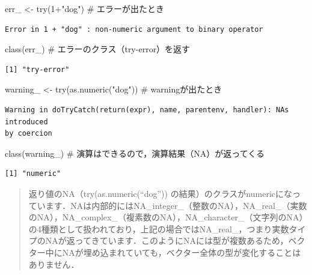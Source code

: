 \documentclass[
  letterpaper,
  DIV=11,
  numbers=noendperiod]{scrreprt}
\newenvironment{Shaded}{\begin{snugshade}}{\end{snugshade}}
\newcommand{\CommentTok}[1]{\textcolor[rgb]{0.37,0.37,0.37}{#1}}
\newcommand{\DecValTok}[1]{\textcolor[rgb]{0.68,0.00,0.00}{#1}}
\newcommand{\FunctionTok}[1]{\textcolor[rgb]{0.28,0.35,0.67}{#1}}
\newcommand{\NormalTok}[1]{\textcolor[rgb]{0.00,0.23,0.31}{#1}}
\newcommand{\OtherTok}[1]{\textcolor[rgb]{0.00,0.23,0.31}{#1}}
\newcommand{\SpecialCharTok}[1]{\textcolor[rgb]{0.37,0.37,0.37}{#1}}
\newcommand{\StringTok}[1]{\textcolor[rgb]{0.13,0.47,0.30}{#1}}
\begin{document}
\begin{Shaded}
\begin{Highlighting}[]
\NormalTok{err\_ }\OtherTok{\textless{}{-}} \FunctionTok{try}\NormalTok{(}\DecValTok{1}\SpecialCharTok{+}\StringTok{"dog"}\NormalTok{) }\CommentTok{\# エラーが出たとき}
\end{Highlighting}
\end{Shaded}

\begin{verbatim}
Error in 1 + "dog" : non-numeric argument to binary operator
\end{verbatim}

\begin{Shaded}
\begin{Highlighting}[]
\FunctionTok{class}\NormalTok{(err\_) }\CommentTok{\# エラーのクラス（try{-}error）を返す}
\end{Highlighting}
\end{Shaded}

\begin{verbatim}
[1] "try-error"
\end{verbatim}

\begin{Shaded}
\begin{Highlighting}[]
\NormalTok{warning\_ }\OtherTok{\textless{}{-}} \FunctionTok{try}\NormalTok{(}\FunctionTok{as.numeric}\NormalTok{(}\StringTok{"dog"}\NormalTok{)) }\CommentTok{\# warningが出たとき}
\end{Highlighting}
\end{Shaded}

\begin{verbatim}
Warning in doTryCatch(return(expr), name, parentenv, handler): NAs introduced
by coercion
\end{verbatim}

\begin{Shaded}
\begin{Highlighting}[]
\FunctionTok{class}\NormalTok{(warning\_) }\CommentTok{\# 演算はできるので，演算結果（NA）が返ってくる}
\end{Highlighting}
\end{Shaded}

\begin{verbatim}
[1] "numeric"
\end{verbatim}

\begin{quote}
返り値のNA（try(as.numeric(``dog''))
の結果）のクラスがnumericになっています．NAは内部的にはNA\_integer\_（整数のNA），NA\_real\_（実数のNA），NA\_complex\_（複素数のNA），NA\_character\_（文字列のNA）の4種類として扱われており，上記の場合ではNA\_real\_，つまり実数タイプのNAが返ってきています．このようにNAには型が複数あるため，ベクター中にNAが埋め込まれていても，ベクター全体の型が変化することはありません．
\end{quote}
\end{document}
